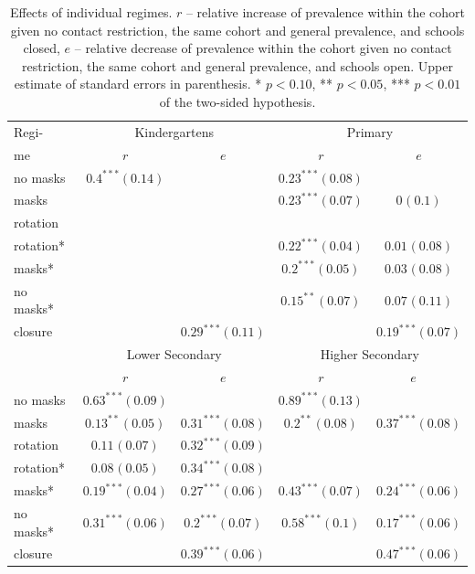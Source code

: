 \documentclass[fleqn,10pt]{wlscirep}
\begin{document}
\begin{table}
\begin{center}
\small

\begin{tabular}{l|cc|cc} Regi- & \multicolumn{2}{c}{Kindergartens}  & \multicolumn{2}{c}{Primary} \\ me  & $r$  & $e$ & $r$  & $e$ \\  \hline
no masks& $0.4^{***}(0.14)$&& $0.23^{***}(0.08)$&\\
masks&&& $0.23^{***}(0.07)$& $0^{}(0.1)$\\
rotation&&&&\\
rotation*&&& $0.22^{***}(0.04)$& $0.01^{}(0.08)$\\
masks*&&& $0.2^{***}(0.05)$& $0.03^{}(0.08)$\\
no masks*&&& $0.15^{**}(0.07)$& $0.07^{}(0.11)$\\
closure&& $0.29^{***}(0.11)$&& $0.19^{***}(0.07)$\\ \hline
& \multicolumn{2}{c}{Lower Secondary} & \multicolumn{2}{c}{Higher Secondary} \\  & $r$  & $e$ & $r$  & $e$ \ \\ \hline
no masks& $0.63^{***}(0.09)$&& $0.89^{***}(0.13)$&\\
masks& $0.13^{**}(0.05)$& $0.31^{***}(0.08)$& $0.2^{**}(0.08)$& $0.37^{***}(0.08)$\\
rotation& $0.11^{}(0.07)$& $0.32^{***}(0.09)$&&\\
rotation*& $0.08^{}(0.05)$& $0.34^{***}(0.08)$&&\\
masks*& $0.19^{***}(0.04)$& $0.27^{***}(0.06)$& $0.43^{***}(0.07)$& $0.24^{***}(0.06)$\\
no masks*& $0.31^{***}(0.06)$& $0.2^{***}(0.07)$& $0.58^{***}(0.1)$& $0.17^{***}(0.06)$\\
closure&& $0.39^{***}(0.06)$&& $0.47^{***}(0.06)$\\
\end{tabular}



\caption{Effects of individual regimes. $r$ -- relative increase of prevalence within the cohort given no contact restriction, the same cohort and general prevalence, and schools closed, $e$ -- relative decrease of prevalence within the cohort given no contact restriction, the same cohort and general prevalence, and schools open. Upper estimate of standard errors in parenthesis. * $p < 0.10$, ** $p < 0.05$, *** $p < 0.01$ of the two-sided hypothesis.}
\label{tab:effects}
\end{center}
\end{table}
\end{document}
